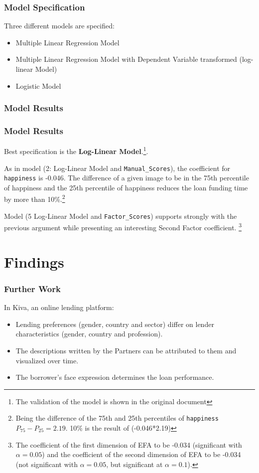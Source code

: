 \documentclass{beamer}
\begin{document}
\begin{frame}\frametitle{Model Specification}
Three different models are specified:
\begin{itemize}
\item Multiple Linear Regression Model
\item Multiple Linear Regression Model with Dependent Variable transformed (log-linear Model)
\item Logistic Model
\end{itemize}
\end{frame}

\begin{frame}[plain]\frametitle{Model Results}

\end{frame}

\begin{frame}\frametitle{Model Results}
Best specification is the \textbf{Log-Linear Model}.\footnote{The validation of the model is shown in the original document}. \par
As in model (2: Log-Linear Model and \texttt{Manual\_Scores}), the coefficient for \texttt{happiness} is -0.046. The difference of a given image to be in the 75th percentile of happiness and the 25th percentile of happiness reduces the loan funding time by more than 10\%.\footnote{Being the difference of the 75th and 25th percentiles of \texttt{happiness} $P_{75}-P_{25}=2.19$. 10\% is the result of (-0.046*2.19)} \par
Model (5 Log-Linear Model and \texttt{Factor\_Scores}) supports strongly with the previous argument while presenting an interesting Second Factor coefficient. \footnote{The coefficient of the first dimension of EFA to be -0.034 (significant with $\alpha=0.05$) and the coefficient of the second dimension of EFA to be -0.034 (not significant with $\alpha=0.05$, but significant at $\alpha=0.1$).} \par
\end{frame}

\section{Findings} 
\begin{frame}\frametitle{Further Work}
In Kiva, an online lending platform:
\begin{itemize}
\item Lending preferences (gender, country and sector) differ on lender characteristics (gender, country and profession).
\item The descriptions written by the Partners can be attributed to them and visualized over time.
\item The borrower's face expression determines the loan performance.
\end{itemize}
\end{frame}
\end{document}
